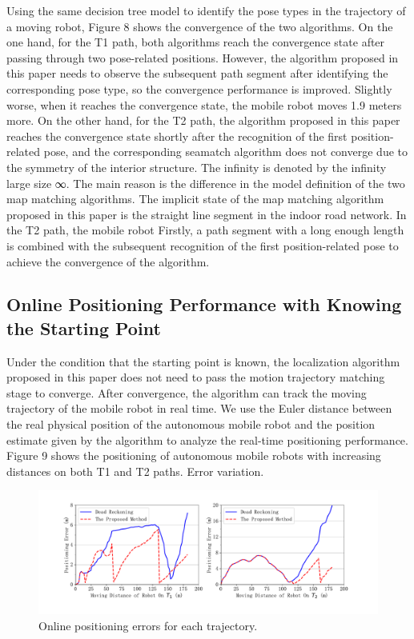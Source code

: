\documentclass{llncs}
\begin{document}
Using the same decision tree model to identify the pose types in the trajectory of a moving robot, Figure 8 shows the convergence of the two algorithms. On the one hand, for the T1 path, both algorithms reach the convergence state after passing through two pose-related positions. However, the algorithm proposed in this paper needs to observe the subsequent path segment after identifying the corresponding pose type, so the convergence performance is improved. Slightly worse, when it reaches the convergence state, the mobile robot moves 1.9 meters more. On the other hand, for the T2 path, the algorithm proposed in this paper reaches the convergence state shortly after the recognition of the first position-related pose, and the corresponding seamatch algorithm does not converge due to the symmetry of the interior structure. The infinity is denoted by the infinity large size ∞. The main reason is the difference in the model definition of the two map matching algorithms. The implicit state of the map matching algorithm proposed in this paper is the straight line segment in the indoor road network. In the T2 path, the mobile robot Firstly, a path segment with a long enough length is combined with the subsequent recognition of the first position-related pose to achieve the convergence of the algorithm.


\subsection{Online Positioning Performance with Knowing the Starting Point}

Under the condition that the starting point is known, the localization algorithm proposed in this paper does not need to pass the motion trajectory matching stage to converge. After convergence, the algorithm can track the moving trajectory of the mobile robot in real time. We use the Euler distance between the real physical position of the autonomous mobile robot and the position estimate given by the algorithm to analyze the real-time positioning performance. Figure 9 shows the positioning of autonomous mobile robots with increasing distances on both T1 and T2 paths. Error variation.

\begin{figure}[!htbp]
	\centering
	\includegraphics[width=5.076in]{RobotMatch-OnlineError}
	\caption{Online positioning errors for each trajectory.}
	\label{fig-online}
\end{figure}
\end{document}
